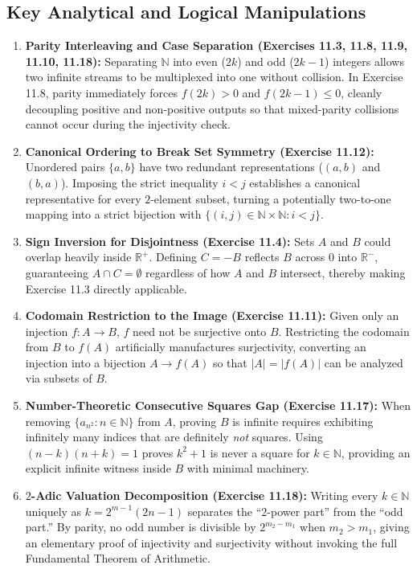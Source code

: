 \documentclass[11pt, letterpaper]{article}
\theoremstyle{definition}
\theoremstyle{remark}
\begin{document}
\subsection{Key Analytical and Logical Manipulations}

\begin{enumerate}[label=\textbf{\arabic*.}]
    \item \textbf{Parity Interleaving and Case Separation (Exercises 11.3, 11.8, 11.9, 11.10, 11.18):}
    Separating $\mathbb{N}$ into even ($2k$) and odd ($2k - 1$) integers allows two infinite streams to be multiplexed into one without collision. In Exercise 11.8, parity immediately forces $f(2k) > 0$ and $f(2k-1) \leq 0$, cleanly decoupling positive and non-positive outputs so that mixed-parity collisions cannot occur during the injectivity check.

    \item \textbf{Canonical Ordering to Break Set Symmetry (Exercise 11.12):}
    Unordered pairs $\{a, b\}$ have two redundant representations ($(a, b)$ and $(b, a)$). Imposing the strict inequality $i < j$ establishes a canonical representative for every $2$-element subset, turning a potentially two-to-one mapping into a strict bijection with $\{(i, j) \in \mathbb{N} \times \mathbb{N} : i < j\}$.

    \item \textbf{Sign Inversion for Disjointness (Exercise 11.4):}
    Sets $A$ and $B$ could overlap heavily inside $\mathbb{R}^+$. Defining $C = -B$ reflects $B$ across $0$ into $\mathbb{R}^-$, guaranteeing $A \cap C = \emptyset$ regardless of how $A$ and $B$ intersect, thereby making Exercise 11.3 directly applicable.

    \item \textbf{Codomain Restriction to the Image (Exercise 11.11):}
    Given only an injection $f : A \to B$, $f$ need not be surjective onto $B$. Restricting the codomain from $B$ to $f(A)$ artificially manufactures surjectivity, converting an injection into a bijection $A \to f(A)$ so that $|A| = |f(A)|$ can be analyzed via subsets of $B$.

    \item \textbf{Number-Theoretic Consecutive Squares Gap (Exercise 11.17):}
    When removing $\{a_{n^2} : n \in \mathbb{N}\}$ from $A$, proving $B$ is infinite requires exhibiting infinitely many indices that are definitely \textit{not} squares. Using $(n - k)(n + k) = 1$ proves $k^2 + 1$ is never a square for $k \in \mathbb{N}$, providing an explicit infinite witness inside $B$ with minimal machinery.

    \item \textbf{$2$-Adic Valuation Decomposition (Exercise 11.18):}
    Writing every $k \in \mathbb{N}$ uniquely as $k = 2^{m-1}(2n - 1)$ separates the ``$2$-power part'' from the ``odd part.'' By parity, no odd number is divisible by $2^{m_2 - m_1}$ when $m_2 > m_1$, giving an elementary proof of injectivity and surjectivity without invoking the full Fundamental Theorem of Arithmetic.
\end{enumerate}
\end{document}
